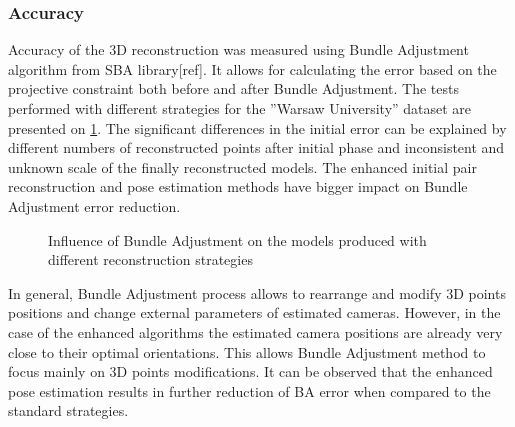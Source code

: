 \subsubsection{Accuracy}
Accuracy of the 3D reconstruction was measured using Bundle Adjustment algorithm from SBA library[ref]. It allows for calculating the error based on the projective constraint both before and after Bundle Adjustment.
The tests performed with different strategies  for the ''Warsaw University'' dataset are presented on \ref{plot:BAError}. The significant differences in the initial error can be explained by different numbers of reconstructed points after initial phase and inconsistent and unknown scale of the finally reconstructed models. The enhanced initial pair reconstruction and pose estimation methods have bigger impact on Bundle Adjustment error reduction.
\begin{figure}[h!]
  \begin{center}
    \caption{Influence of Bundle Adjustment on the models produced with different reconstruction strategies }
    \label{plot:BAError}
  \end{center}
\end{figure}
\clearpage
In general, Bundle Adjustment process allows to rearrange and modify 3D points positions and change external parameters of estimated cameras. However, in the case of the enhanced algorithms the estimated camera positions are already very close to their optimal orientations. This allows Bundle Adjustment method to focus mainly on 3D points modifications. It can be observed that the enhanced pose estimation results in further reduction of BA error when compared to the standard strategies. 

